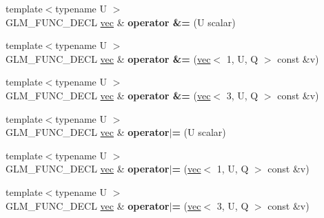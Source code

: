 \begin{DoxyCompactItemize}
\item 
\mbox{\label{structglm_1_1vec_3_013_00_01T_00_01Q_01_4_a53ed94a1a8c5d6e72de59460b96ac122}} 
{\footnotesize template$<$typename U $>$ }\\G\+L\+M\+\_\+\+F\+U\+N\+C\+\_\+\+D\+E\+CL \hyperlink{structglm_1_1vec}{vec} \& {\bfseries operator \&=} (U scalar)
\item 
\mbox{\label{structglm_1_1vec_3_013_00_01T_00_01Q_01_4_a4004b269d4ba52855467734b9acbad9f}} 
{\footnotesize template$<$typename U $>$ }\\G\+L\+M\+\_\+\+F\+U\+N\+C\+\_\+\+D\+E\+CL \hyperlink{structglm_1_1vec}{vec} \& {\bfseries operator \&=} (\hyperlink{structglm_1_1vec}{vec}$<$ 1, U, Q $>$ const \&v)
\item 
\mbox{\label{structglm_1_1vec_3_013_00_01T_00_01Q_01_4_ab9bb5a0a46b3788c7ddfef17b53bae95}} 
{\footnotesize template$<$typename U $>$ }\\G\+L\+M\+\_\+\+F\+U\+N\+C\+\_\+\+D\+E\+CL \hyperlink{structglm_1_1vec}{vec} \& {\bfseries operator \&=} (\hyperlink{structglm_1_1vec}{vec}$<$ 3, U, Q $>$ const \&v)
\item 
\mbox{\label{structglm_1_1vec_3_013_00_01T_00_01Q_01_4_a0e29cf6b424eea7861eabc0314b5503a}} 
{\footnotesize template$<$typename U $>$ }\\G\+L\+M\+\_\+\+F\+U\+N\+C\+\_\+\+D\+E\+CL \hyperlink{structglm_1_1vec}{vec} \& {\bfseries operator$\vert$=} (U scalar)
\item 
\mbox{\label{structglm_1_1vec_3_013_00_01T_00_01Q_01_4_af0bea30bfc8f2f2b752cb089670fc904}} 
{\footnotesize template$<$typename U $>$ }\\G\+L\+M\+\_\+\+F\+U\+N\+C\+\_\+\+D\+E\+CL \hyperlink{structglm_1_1vec}{vec} \& {\bfseries operator$\vert$=} (\hyperlink{structglm_1_1vec}{vec}$<$ 1, U, Q $>$ const \&v)
\item 
\mbox{\label{structglm_1_1vec_3_013_00_01T_00_01Q_01_4_a90a93293245e58f807968ae29f1c633a}} 
{\footnotesize template$<$typename U $>$ }\\G\+L\+M\+\_\+\+F\+U\+N\+C\+\_\+\+D\+E\+CL \hyperlink{structglm_1_1vec}{vec} \& {\bfseries operator$\vert$=} (\hyperlink{structglm_1_1vec}{vec}$<$ 3, U, Q $>$ const \&v)

\end{DoxyCompactItemize}
